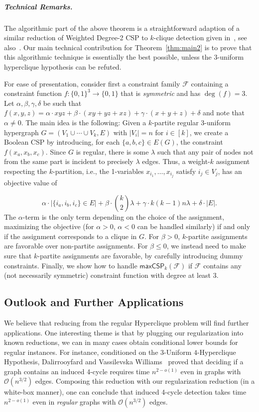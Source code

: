 \documentclass[a4paper,UKenglish,cleveref, autoref, thm-restate,numberwithinsect]{lipics-v2021}
\newcommand{\bigO}{\mathcal{O}}
\newcommand{\maxcspk}{\textsf{maxCSP}_{k}}
\newcommand{\Fam}{\mathcal{F}}
\begin{document}
\subparagraph*{Technical Remarks.}
The algorithmic part of the above theorem is a straightforward adaption of a similar reduction of Weighted Degree-2 CSP to $k$-clique detection given in~\cite[Section 6.5]{Wil07}, see also~\cite{LincolnWW18, BringmannCFK22}. Our main technical contribution for Theorem~\ref{thm:main2} is to prove that this algorithmic technique is essentially the best possible, unless the 3-uniform hyperclique hypothesis can be refuted. 

For ease of presentation, consider first a constraint family $\Fam$ containing a constraint function $f:\{0,1\}^3\to\{0,1\}$ that is \emph{symmetric} and has $\deg(f) = 3$. Let $\alpha,\beta,\gamma,\delta$ be such that $f(x,y,z) = \alpha \cdot xyz + \beta \cdot (xy + yz + xz) + \gamma \cdot (x+y+z) + \delta$ and note that $\alpha \ne 0$. The main idea is the following: Given a $k$-partite regular 3-uniform hypergraph $G=(V_1 \cup \cdots \cup V_k, E)$ with $|V_i| = n$ for $i \in [k]$, we create a Boolean CSP by introducing, for each $\{a,b,c\} \in E(G)$, the constraint $f(x_a,x_b,x_c)$. Since $G$ is regular, there is some $\lambda$ such that any pair of nodes not from the same part is incident to precisely $\lambda$ edges. Thus, a weight-$k$ assignment respecting the $k$-partition, i.e., the 1-variables $x_{i_1},\dots, x_{i_j}$ satisfy $i_j \in V_j$, has an objective value of

\[ \alpha \cdot |\{i_a, i_b, i_c\}\in E|+\beta \cdot \binom{k}{2} \lambda + \gamma \cdot k(k-1)n\lambda + \delta \cdot |E|.\]
The $\alpha$-term is the only term depending on the choice of the assignment, maximizing the objective (for $\alpha > 0$, $\alpha < 0$ can be handled similarly) if and only if the assignment corresponds to a clique in $G$. 
For $\beta > 0$, $k$-partite assignments are favorable over non-partite assignments. For $\beta \le 0$, we instead need to make sure that $k$-partite assignments are favorable, by carefully introducing dummy constraints. 
Finally, we show how to handle $\maxcspk(\Fam)$ if $\Fam$ contains any (not necessarily symmetric) constraint function with degree at least 3.

\subsection{Outlook and Further Applications}
\label{sec:intro-outlook}
We believe that reducing from the regular Hyperclique problem will find further applications. One interesting theme is that by plugging our regularization into known reductions, we can in many cases obtain conditional lower bounds for regular instances. For instance, conditioned on the $3$-Uniform $4$-Hyperclique Hypothesis, Dalirrooyfard and Vassilevska Williams~\cite{DalirrooyfardW22} proved that deciding if a graph contains an induced 4-cycle requires time $n^{2-o(1)}$ even in graphs with $\bigO(n^{3/2})$ edges. Composing this reduction with our regularization reduction (in a white-box manner), one can conclude that induced 4-cycle detection takes time $n^{2-o(1)}$ even in \emph{regular} graphs with $\bigO(n^{3/2})$ edges.
\end{document}
